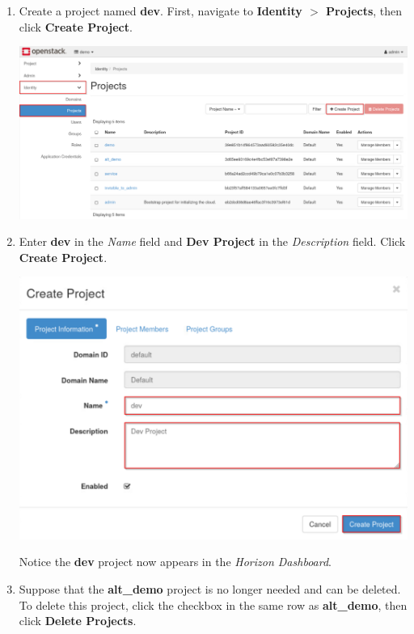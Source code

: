 \documentclass[letterpaper, 12pt]{article}
\begin{document}
\begin{enumerate}
    \item Create a project named \textbf{dev}. First, navigate to \textbf{Identity $>$ Projects}, then click
    \textbf{Create Project}.

    \begin{center}
        \includegraphics[width=\linewidth]{images/part1/step5.png}
    \end{center}

    \item Enter \textbf{dev} in the \textit{Name} field and \textbf{Dev Project} in the \textit{Description} field.
    Click \textbf{Create Project}.

    \begin{center}
        \includegraphics[width=\linewidth]{images/part1/step6.png}
    \end{center}

    \begin{notebox}
        Notice the \textbf{dev} project now appears in the \textit{Horizon Dashboard}.
    \end{notebox}

    \item Suppose that the \textbf{alt\_demo} project is no longer needed and can be deleted. To delete this project,
    click the checkbox in the same row as \textbf{alt\_demo}, then click \textbf{Delete Projects}.


\end{enumerate}
\end{document}
